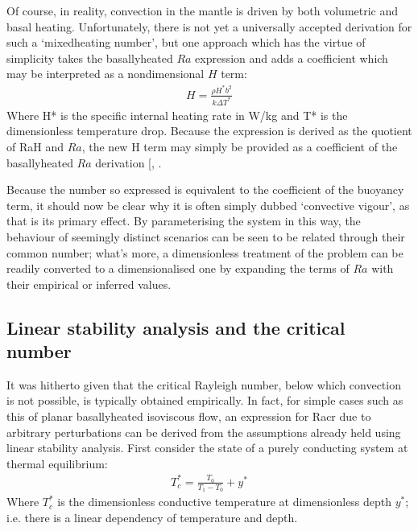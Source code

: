 \documentclass[letterpaper,10pt,english]{jupyterBook}
\begin{document}
\sphinxAtStartPar
Of course, in reality, convection in the mantle is driven by both volumetric and basal heating. Unfortunately, there is not yet a universally accepted derivation for such a ‘mixed\sphinxhyphen{}heating  number’, but one approach which has the virtue of simplicity takes the basally\sphinxhyphen{}heated \(Ra\) expression and adds a coefficient which may be interpreted as a non\sphinxhyphen{}dimensional \(H\) term:
\begin{equation*}
\begin{split} H = \frac{\rho H^* b^2}{k \Delta T^*} \end{split}
\end{equation*}
\sphinxAtStartPar
Where H* is the specific internal heating rate in W/kg and T* is the dimensionless temperature drop. Because the expression is derived as the quotient of RaH and \(Ra\), the new H term may simply be provided as a coefficient of the basally\sphinxhyphen{}heated \(Ra\) derivation {[}, \sphinxcite{references:id89}{]}.

\sphinxAtStartPar
Because the  number so expressed is equivalent to the coefficient of the buoyancy term, it should now be clear why it is often simply dubbed ‘convective vigour’, as that is its primary effect. By parameterising the system in this way, the behaviour of seemingly distinct scenarios can be seen to be related through their common  number; what’s more, a dimensionless treatment of the problem can be readily converted to a dimensionalised one by expanding the terms of \(Ra\) with their empirical or inferred values.


\subsection{Linear stability analysis and the critical  number}
\label{\detokenize{content/chapter_02_methods/section1:linear-stability-analysis-and-the-critical-rayleigh-number}}
\sphinxAtStartPar
It was hitherto given that the critical Rayleigh number, below which convection is not possible, is typically obtained empirically. In fact, for simple cases such as this of planar basally\sphinxhyphen{}heated isoviscous flow, an expression for Racr due to arbitrary perturbations can be derived from the assumptions already held using linear stability analysis. First consider the state of a purely conducting system at thermal equilibrium:
\begin{equation*}
\begin{split} T_c^* = \frac{T_0}{T_1 - T_0} + y^* \end{split}
\end{equation*}
\sphinxAtStartPar
Where \(T_c^*\) is the dimensionless conductive temperature at dimensionless depth \(y^*\); i.e. there is a linear dependency of temperature and depth.
\end{document}
